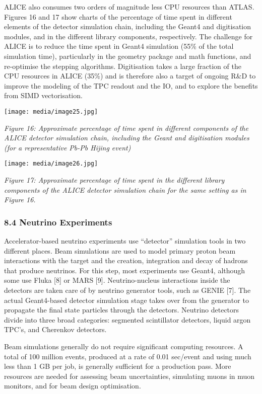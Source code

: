 \documentclass[12pt,a4paper]{article}
\begin{document}
ALICE also consumes two orders of magnitude less CPU resources than
ATLAS. Figures 16 and 17 show charts of the percentage of time spent in
different elements of the detector simulation chain, including the
Geant4 and digitisation modules, and in the different library
components, respectively. The challenge for ALICE is to reduce the time
spent in Geant4 simulation (55\% of the total simulation time),
particularly in the geometry package and math functions, and re-optimise
the stepping algorithms. Digitisation takes a large fraction of the CPU
resources in ALICE (35\%) and is therefore also a target of ongoing R\&D
to improve the modeling of the TPC readout and the IO, and to explore
the benefits from SIMD vectorisation.

\texttt{[image: media/image25.jpg]}

\emph{Figure 16: Approximate percentage of time spent in different
components of the ALICE detector simulation chain, including the Geant
and digitisation modules (for a representative Pb-Pb Hijing event)}

\texttt{[image: media/image26.jpg]}

\emph{Figure 17: Approximate percentage of time spent in the different
library components of the ALICE detector simulation chain for the same
setting as in Figure 16.}

\hypertarget{neutrino-experiments}{%
\subsubsection{8.4 Neutrino Experiments}\label{neutrino-experiments}}

Accelerator-based neutrino experiments use ``detector'' simulation tools
in two different places. Beam simulations are used to model primary
proton beam interactions with the target and the creation, integration
and decay of hadrons that produce neutrinos. For this step, most
experiments use Geant4, although some use Fluka {[}8{]} or MARS {[}9{]}.
Neutrino-nucleus interactions inside the detectors are taken care of by
neutrino generator tools, such as GENIE {[}7{]}. The actual Geant4-based
detector simulation stage takes over from the generator to propagate the
final state particles through the detectors. Neutrino detectors divide
into three broad categories: segmented scintillator detectors, liquid
argon TPC's, and Cherenkov detectors.

Beam simulations generally do not require significant computing
resources. A total of 100 million events, produced at a rate of 0.01
sec/event and using much less than 1 GB per job, is generally sufficient
for a production pass. More resources are needed for assessing beam
uncertainties, simulating muons in muon monitors, and for beam design
optimisation.
\end{document}
